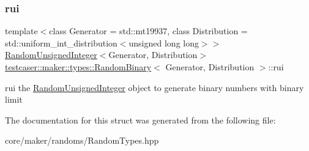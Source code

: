 \subsubsection{\texorpdfstring{rui}{rui}}
{\footnotesize\ttfamily template$<$class Generator = std\+::mt19937, class Distribution = std\+::uniform\+\_\+int\+\_\+distribution$<$unsigned long long$>$$>$ \\
\mbox{\hyperlink{classtestcaser_1_1maker_1_1types_1_1RandomUnsignedInteger}{Random\+Unsigned\+Integer}}$<$Generator, Distribution$>$ \mbox{\hyperlink{structtestcaser_1_1maker_1_1types_1_1RandomBinary}{testcaser\+::maker\+::types\+::\+Random\+Binary}}$<$ Generator, Distribution $>$\+::rui}



rui the \mbox{\hyperlink{classtestcaser_1_1maker_1_1types_1_1RandomUnsignedInteger}{Random\+Unsigned\+Integer}} object to generate binary numbers with binary limit 



The documentation for this struct was generated from the following file\+:\begin{DoxyCompactItemize}
\item 
core/maker/randoms/Random\+Types.\+hpp\end{DoxyCompactItemize}
